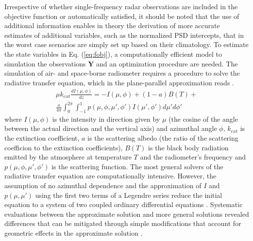 \documentclass[10pt]{ietbook}
\begin{document}
Irrespective of whether single-frequency radar observations are included in the objective function or automatically satisfied, it should
be noted that the use of additional information enables in theory the derivation of more accurate estimates of additional variables, such
as the normalized PSD intercepts, that in the worst case scenarios are simply set up based on their climatology. To estimate the state
variables in Eq. (\ref{eq:fobj}), a computationally efficient model to simulation the observations $\mathbf{Y}$ and an optimization procedure
are needed.  The simulation of air- and space-borne radiometer requires a procedure to solve the radiative transfer equation, which
in the plane-parallel approximation reads \cite{kummerow1993}.
\begin{multline}\label{eq:rte}
\mu k_{ext}\frac {dI(\mu,\phi)}{dz}=-I(\mu,\phi) + (1-a)B(T)+\\
\frac {a} {4\pi} \int_0^{2\pi}\int_{-1}^{1}p(\mu,\phi,\mu',\phi')I(\mu',\phi')d\mu'd\phi'
\end{multline}
where $I(\mu,\phi)$ is the intensity in direction given by $\mu$ (the cosine of the angle between the actual direction and 
the vertical axis) and azimuthal angle $\phi$, $k_{ext}$ is the extinction coefficient, $a$ is the scattering albedo (the ratio
of the scattering coefficion to the extinction coefficients), $B(T)$ is the black body radiation emitted by the atmosphere at 
temperature $T$ and the radiometer's frequency and $p(\mu,\phi,\mu',\phi')$ is the scattering function. The most general solvers
of the radiative transfer equation are computationally intensive.  However, the assumption of no azimuthal dependence and the
approximation of $I$ and $p(\mu,\mu')$ using the first two terms of a Legendre series \cite{kummerow1993} reduce the initial equation
to a system of two coupled ordinary differential equations \cite{kummerow1993}.  Systematic evaluations between the approximate solution
and more general solutions revealed differences that can be mitigated through simple modifications that account for geometric effects in
the approximate solution \cite{liu1996}.
\end{document}
